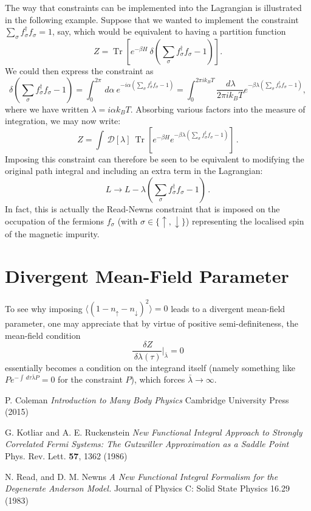 \documentclass[12pt]{article}
\DeclareMathOperator{\Tr}{Tr}
\begin{document}
The way that constraints can be implemented into the Lagrangian is illustrated in the following example. Suppose that we wanted to implement the constraint $ \sum_{\sigma} f^{\dagger}_{\sigma} f^{}_{\sigma} = 1 $, say, which would be equivalent to having a partition function $$ Z = \Tr{\left[ e^{- \beta H}~\delta{\left( \sum_{\sigma} f^{\dagger}_{\sigma} f^{}_{\sigma} - 1 \right)} \right]} . $$ We could then express the constraint as $$ \delta{\left( \sum_{\sigma} f^{\dagger}_{\sigma} f^{}_{\sigma} - 1 \right)} = \int_{0}^{2 \pi} \,d\alpha~e^{- i \alpha (\sum_{\sigma} f^{\dagger}_{\sigma} f^{}_{\sigma} - 1)} = \int_{0}^{2 \pi i k_B T} \frac{\,d \lambda}{2 \pi i k_B T} e^{- \beta \lambda (\sum_{\sigma} f^{\dagger}_{\sigma} f^{}_{\sigma} - 1)}, $$ where we have written $ \lambda = i \alpha k_B T $. Absorbing various factors into the measure of integration, we may now write: $$ Z = \int \, \mathcal{D} [\lambda]~\Tr{\left[ e^{- \beta H} e^{- \beta \lambda (\sum_{\sigma} f^{\dagger}_{\sigma} f^{}_{\sigma} - 1)} \right]} \,. $$ Imposing this constraint can therefore be seen to be equivalent to modifying the original path integral and including an extra term in the Lagrangian: $$ L \rightarrow L - \lambda \left( \sum_{\sigma} f^{\dagger}_{\sigma} f^{}_{\sigma} - 1 \right) \,. $$ In fact, this is actually the Read-Newns constraint that is imposed on the occupation of the fermions $ f^{}_{\sigma} $ (with $ \sigma \in \{ \uparrow , \downarrow \}$) representing the localised spin of the magnetic impurity.

\section{Divergent Mean-Field Parameter}
\label{sec:Divergence}

To see why imposing $ \langle (1 - n_{\uparrow} - n_{\downarrow})^2 \rangle = 0 $ leads to a divergent mean-field parameter, one may appreciate that by virtue of positive semi-definiteness, the mean-field condition \[ \frac{\, \delta Z}{\, \delta \lambda(\tau)} \Bigr|_{\bar{\lambda}} = 0 \] essentially becomes a condition on the integrand itself (namely something like $ P e^{- \int \, d\tau \bar{\lambda} P} = 0 $ for the constraint $ P $), which forces $ \bar{\lambda} \rightarrow \infty $.

\begin{thebibliography}{1}

P. Coleman
\emph{Introduction to Many Body Physics}
Cambridge University Press (2015)

G. Kotliar and A. E. Ruckenstein
\emph{New Functional Integral Approach to Strongly Correlated Fermi Systems: The Gutzwiller Approximation as a Saddle Point}
Phys. Rev. Lett. \textbf{57}, 1362 (1986)

N. Read, and D. M. Newns
\emph{A New Functional Integral Formalism for the Degenerate Anderson Model.} Journal of Physics C: Solid State Physics 16.29 (1983)

\end{thebibliography}
\end{document}
